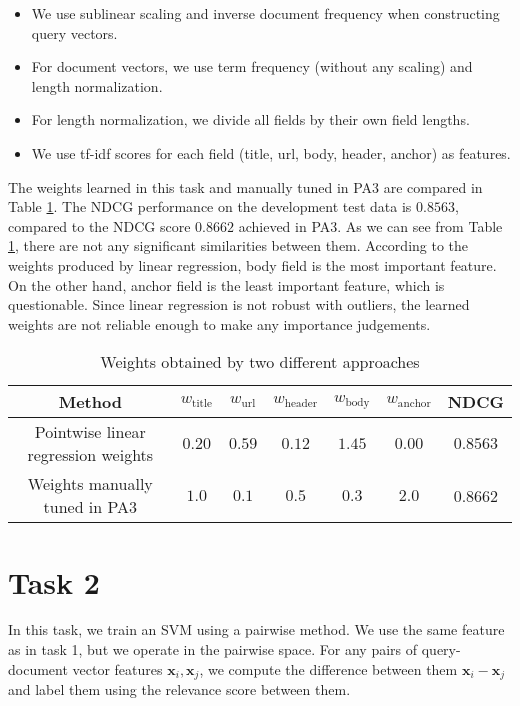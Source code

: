 \begin{itemize}
\item We use sublinear scaling and inverse document frequency when constructing query vectors.
\item For document vectors, we use term frequency (without any scaling) and length normalization.
\item For length normalization, we divide all fields by their own field lengths.
\item We use tf-idf scores for each field (title, url, body, header, anchor) as features.
\end{itemize}

The weights learned in this task and manually tuned in PA3 are compared in Table \ref{tab:wt}.
The NDCG performance on the development test data is $0.8563$, compared to the NDCG score $0.8662$ achieved in PA3.
As we can see from Table \ref{tab:wt}, there are not any significant similarities between them.
According to the weights produced by linear regression, body field is the most important feature. On the other hand,
anchor field is the least important feature, which is questionable. Since linear regression is not robust with outliers,
the learned weights are not reliable enough to make any importance judgements.

\begin{table}[h!]
\begin{center}
\begin{tabular}{|c|c|c|c|c|c|c|}
  \hline
  Method & $w_\textrm{title}$ & $w_\textrm{url}$ & $w_\textrm{header}$ & $w_\textrm{body}$ & $w_\textrm{anchor}$ & NDCG \\
  \hline
  Pointwise linear regression weights & $0.20$ & $0.59$ & $0.12$ & $1.45$ & $0.00$ & $0.8563$ \\
  \hline
  Weights manually tuned in PA3 & $1.0$ & $0.1$ & $0.5$ & $0.3$ & $2.0$ & 0.8662 \\
  \hline
\end{tabular}
\caption{Weights obtained by two different approaches}\label{tab:wt}
\end{center}
\end{table}

\section*{Task 2}
In this task, we train an SVM using a pairwise method.
We use the same feature as in task 1, but we operate in the pairwise space.
For any pairs of query-document vector features $\mathbf{x}_i, \mathbf{x}_j$, we compute the difference between them $\mathbf{x}_i - \mathbf{x}_j$ and label them using the relevance score between them.

